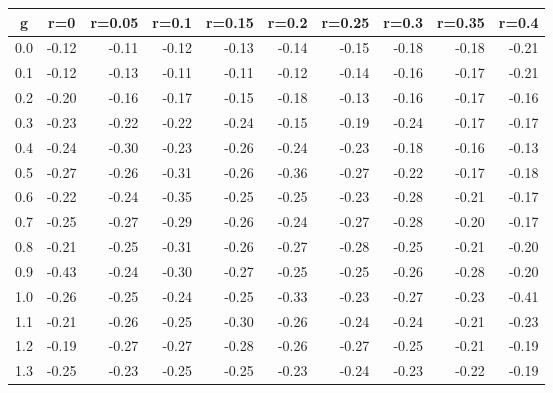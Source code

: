 %
\begin{table}[!tbp]
 \begin{center}
 \begin{tabular}{rrrrrrrrrr}\hline\hline
\multicolumn{1}{c}{g}&\multicolumn{1}{c}{r=0}&\multicolumn{1}{c}{r=0.05}&\multicolumn{1}{c}{r=0.1}&\multicolumn{1}{c}{r=0.15}&\multicolumn{1}{c}{r=0.2}&\multicolumn{1}{c}{r=0.25}&\multicolumn{1}{c}{r=0.3}&\multicolumn{1}{c}{r=0.35}&\multicolumn{1}{c}{r=0.4}\tabularnewline
\hline
0.0&-0.12&-0.11&-0.12&-0.13&-0.14&-0.15&-0.18&-0.18&-0.21\tabularnewline
0.1&-0.12&-0.13&-0.11&-0.11&-0.12&-0.14&-0.16&-0.17&-0.21\tabularnewline
0.2&-0.20&-0.16&-0.17&-0.15&-0.18&-0.13&-0.16&-0.17&-0.16\tabularnewline
0.3&-0.23&-0.22&-0.22&-0.24&-0.15&-0.19&-0.24&-0.17&-0.17\tabularnewline
0.4&-0.24&-0.30&-0.23&-0.26&-0.24&-0.23&-0.18&-0.16&-0.13\tabularnewline
0.5&-0.27&-0.26&-0.31&-0.26&-0.36&-0.27&-0.22&-0.17&-0.18\tabularnewline
0.6&-0.22&-0.24&-0.35&-0.25&-0.25&-0.23&-0.28&-0.21&-0.17\tabularnewline
0.7&-0.25&-0.27&-0.29&-0.26&-0.24&-0.27&-0.28&-0.20&-0.17\tabularnewline
0.8&-0.21&-0.25&-0.31&-0.26&-0.27&-0.28&-0.25&-0.21&-0.20\tabularnewline
0.9&-0.43&-0.24&-0.30&-0.27&-0.25&-0.25&-0.26&-0.28&-0.20\tabularnewline
1.0&-0.26&-0.25&-0.24&-0.25&-0.33&-0.23&-0.27&-0.23&-0.41\tabularnewline
1.1&-0.21&-0.26&-0.25&-0.30&-0.26&-0.24&-0.24&-0.21&-0.23\tabularnewline
1.2&-0.19&-0.27&-0.27&-0.28&-0.26&-0.27&-0.25&-0.21&-0.19\tabularnewline
1.3&-0.25&-0.23&-0.25&-0.25&-0.23&-0.24&-0.23&-0.22&-0.19\tabularnewline
\hline
\end{tabular}

\end{center}

\end{table}

